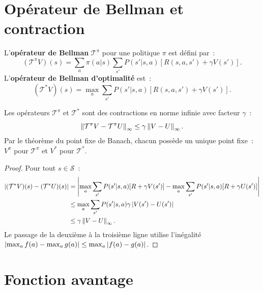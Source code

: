 \section{Op\'erateur de Bellman et contraction}

\begin{definition}
L'\textbf{op\'erateur de Bellman} $\mathcal{T}^\pi$ pour une politique $\pi$
est d\'efini par~:
\[
    (\mathcal{T}^\pi V)(s) = \sum_a \pi(a|s) \sum_{s'} P(s'|s,a)
    [R(s,a,s') + \gamma V(s')].
\]
L'\textbf{op\'erateur de Bellman d'optimalit\'e} est~:
\[
    (\mathcal{T}^* V)(s) = \max_a \sum_{s'} P(s'|s,a)
    [R(s,a,s') + \gamma V(s')].
\]
\end{definition}

\begin{theoreme}
\label{thm:contraction}
Les op\'erateurs $\mathcal{T}^\pi$ et $\mathcal{T}^*$ sont des contractions en
norme infinie avec facteur $\gamma$~:
\[
    \left\| \mathcal{T}^\pi V - \mathcal{T}^\pi U \right\|_\infty
    \leq \gamma \left\| V - U \right\|_\infty.
\]
Par le th\'eor\`eme du point fixe de Banach, chacun poss\`ede un unique point fixe~:
$V^\pi$ pour $\mathcal{T}^\pi$ et $V^*$ pour $\mathcal{T}^*$.
\end{theoreme}

\begin{proof}
Pour tout $s \in \mathcal{S}$~:
\begin{align*}
    \left| (\mathcal{T}^* V)(s) - (\mathcal{T}^* U)(s) \right|
    &= \left| \max_a \sum_{s'} P(s'|s,a)[R + \gamma V(s')]
       - \max_a \sum_{s'} P(s'|s,a)[R + \gamma U(s')] \right| \\
    &\leq \max_a \sum_{s'} P(s'|s,a) \gamma \left| V(s') - U(s') \right| \\
    &\leq \gamma \left\| V - U \right\|_\infty.
\end{align*}
Le passage de la deuxi\`eme \`a la troisi\`eme ligne utilise l'in\'egalit\'e
$\left| \max_a f(a) - \max_a g(a) \right| \leq \max_a \left| f(a) - g(a) \right|$.
\end{proof}

\section{Fonction avantage}

